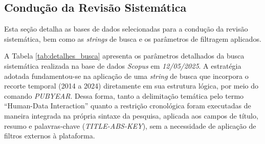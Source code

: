 \documentclass[
	12pt,				%
	oneside,			%
	a4paper,			%
	english,			%
	brazil				%
	]{abntex2ppgsi}
\begin{document}
    



 \subsection{Condução da Revisão Sistemática}

    Esta seção detalha as bases de dados selecionadas para a condução da revisão sistemática, bem como as \textit{strings} de busca e os parâmetros de filtragem aplicados.

    A Tabela \ref{tab:detalhes_busca} apresenta os parâmetros detalhados da busca sistemática realizada na base de dados \emph{Scopus} em \emph{12/05/2025}. A estratégia adotada fundamentou-se na aplicação de uma \textit{string} de busca que incorpora o recorte temporal (2014 a 2024) diretamente em sua estrutura lógica, por meio do comando \textit{PUBYEAR}. Dessa forma, tanto a delimitação temática pelo termo ``Human-Data Interaction'' quanto a restrição cronológica foram executadas de maneira integrada na própria sintaxe da pesquisa, aplicada aos campos de título, resumo e palavras-chave (\textit{TITLE-ABS-KEY}), sem a necessidade de aplicação de filtros externos à plataforma.
\end{document}
